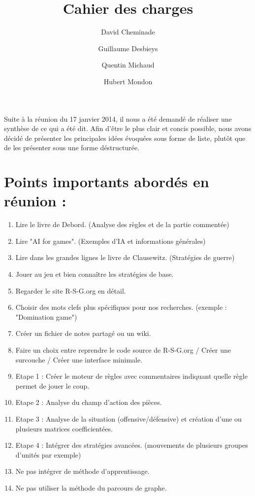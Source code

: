 \documentclass[12pt]{article}
\title{Cahier des charges}
\author{
        David Cheminade
        \and
        Guillaume Desbieys
        \and
        Quentin Michaud
        \and
        Hubert Mondon
}
\date{}
\begin{document}
 
        \maketitle{}                             

				Suite à la réunion du 17 janvier 2014, il nous a été demandé de réaliser une synthèse de ce qui a été dit. Afin d'être le plus clair et concis possible, nous avons décidé de présenter les principales idées évoquées sous forme de liste, plutôt que de les présenter sous une forme déstructurée.
				
				\section{Points importants abordés en réunion :}

                \begin{enumerate}
                
                        \item Lire le livre de Debord. (Analyse des règles et de la partie commentée)
                        \item Lire "AI for games". (Exemples d'IA et informations générales)
                        \item Lire dans les grandes lignes le livre de Clausewitz. (Stratégies de guerre)
                        \item Jouer au jeu et bien connaître les stratégies de base.
                        \item Regarder le site R-S-G.org en détail.
                        \item Choisir des mots clefs plus spécifiques pour nos recherches. (exemple : "Domination game")
                        \item Créer un fichier de notes partagé ou un wiki.
                        \item Faire un choix entre reprendre le code source de R-S-G.org / Créer une surcouche / Créer une interface minimale.
                        \item Etape 1 : Créer le moteur de règles avec commentaires indiquant quelle règle permet de jouer le coup.
                        \item Etape 2 : Analyse du champ d'action des pièces.
                        \item Etape 3 : Analyse de la situation (offensive/défensive) et création d'une ou plusieurs matrices coefficientées.
                        \item Etape 4 : Intégrer des stratégies avancées. (mouvements de plusieurs groupes d'unités par exemple)
                        \item Ne pas intégrer de méthode d'apprentissage.
                        \item Ne pas utiliser la méthode du parcours de graphe.
                       
                \end{enumerate}   
\end{document}
